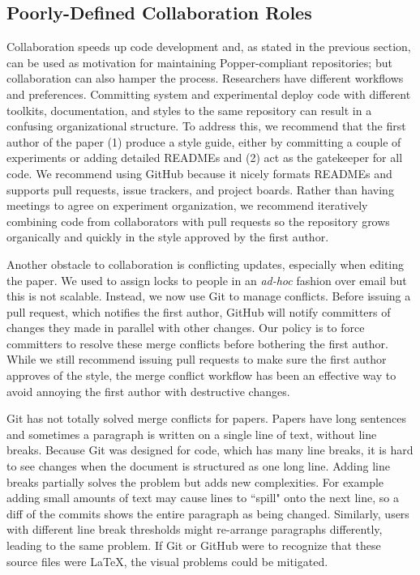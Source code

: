 \subsection{Poorly-Defined Collaboration Roles}

Collaboration  speeds up code development and, as stated in the previous
section, can be used as motivation for maintaining Popper-compliant repositories;
but collaboration can also hamper the process.  Researchers have different
workflows and preferences. Committing system and experimental deploy code with
different toolkits, documentation, and styles to the same repository can result
in a confusing organizational structure.  To address this, we recommend that
the first author of the paper (1) produce a style guide, either by committing a
couple of experiments or adding detailed READMEs and (2) act as the gatekeeper
for all code. We recommend using GitHub because it nicely formats READMEs and
supports pull requests, issue trackers, and project boards.  Rather than having
meetings to agree on experiment organization, we recommend iteratively
combining code from collaborators with pull requests so the repository grows
organically and quickly in the style approved by the first author.

Another obstacle to collaboration is conflicting updates, especially when
editing the paper. We used to assign locks to people in an {\it ad-hoc} fashion
over email but this is not scalable. Instead, we now use Git to manage
conflicts.  Before issuing a pull request, which notifies the first author,
GitHub will notify committers of changes they made in parallel with other
changes. Our policy is to force committers to resolve these merge conflicts
before bothering the first author. While we still recommend issuing pull
requests to make sure the first author approves of the style, the merge
conflict workflow has been an effective way to avoid annoying the first author
with destructive changes.

Git has not totally solved merge conflicts for papers. Papers have long
sentences and sometimes a paragraph is written on a single line of text,
without line breaks. Because Git was designed for code, which has many line
breaks, it is hard to see changes when the document is structured as one long
line. Adding line breaks partially solves the problem but adds new
complexities. For example adding small amounts of text may cause lines to
``spill" onto the next line, so a diff of the commits shows the entire
paragraph as being changed. Similarly, users with different line break
thresholds might re-arrange paragraphs differently, leading to the same
problem. If Git or GitHub were to recognize that these source files were
\LaTeX, the visual problems could be mitigated.

